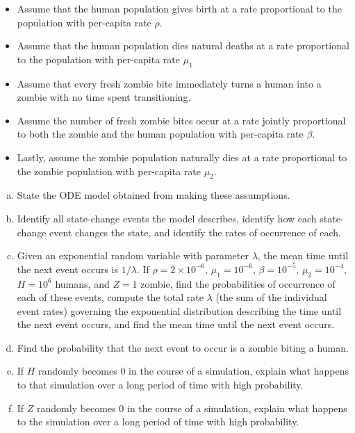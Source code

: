 \begin{exercises}
\begin{itemize}
\item Assume that the human population gives birth at a rate proportional to the population with per-capita rate $\rho$.
\item Assume that the human population dies natural deaths at a rate proportional to the population with per-capita rate $\mu_1$
\item Assume that every fresh zombie bite immediately turns a human into a zombie with no time spent transitioning.
\item Assume the number of fresh zombie bites occur at a rate jointly proportional to both the zombie and the human population with per-capita rate $\beta$.
\item Lastly, assume the zombie population naturally dies at a rate proportional to the zombie population with per-capita rate $\mu_2$.
\end{itemize}

\begin{enumerate}[(a)]
\item State the ODE model obtained from making these assumptions.
\item Identify all state-change events the model describes, identify how each state-change event changes the state, and identify the rates of occurrence of each.
\item Given an exponential random variable with parameter $\lambda$, the mean time until the next event occurs is $1/\lambda$. If $\rho = 2 \times 10^{-6}$, $\mu_1 = 10^{-6}$, $\beta = 10^{-5}$, $\mu_2 = 10^{-4}$, $H = 10^6$ humans, and $Z = 1$ zombie, find the probabilities of occurrence of each of these events, compute the total rate $\lambda$ (the sum of the individual event rates) governing the exponential distribution describing the time until the next event occurs, and find the mean time until the next event occurs.
\item Find the probability that the next event to occur is a zombie biting a human.
\item If $H$ randomly becomes $0$ in the course of a simulation, explain what happens to that simulation over a long period of time with high probability.
\item If $Z$ randomly becomes $0$ in the course of a simulation, explain what happens to the simulation over a long period of time with high probability.
\end{enumerate}


\end{exercises}

